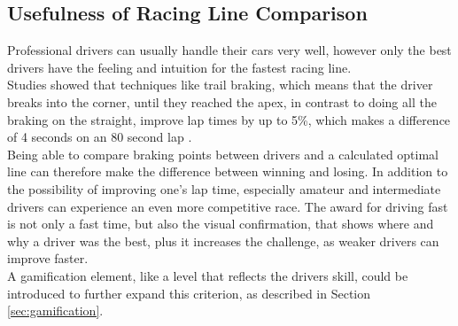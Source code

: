 \subsection{Usefulness of Racing Line Comparison}
Professional drivers can usually handle their cars very well, however only the best drivers have the feeling and intuition for the fastest racing line.\\
Studies showed that techniques like trail braking, which means that the driver breaks into the corner, until they reached the apex, in contrast to doing all the braking on the straight, improve lap times by up to 5\%, which makes a difference of 4 seconds on an 80 second lap \cite{gustafsson08}.\\
Being able to compare braking points between drivers and a calculated optimal line can therefore make the difference between winning and losing.
\clearpage
In addition to the possibility of improving one's lap time, especially amateur and intermediate drivers can experience an even more competitive race. The award for driving fast is not only a fast time, but also the visual confirmation, that shows where and why a driver was the best, plus it increases the challenge, as weaker drivers can improve faster.\\
A gamification element, like a level that reflects the drivers skill, could be introduced to further expand this criterion, as described in Section \ref{sec:gamification}.

\clearpage
